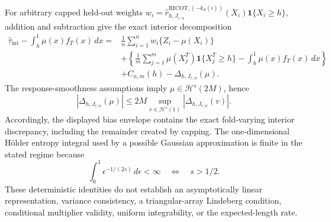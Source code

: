 For arbitrary capped held-out weights \(w_i=\widehat r^{\mathrm{RICOT},(-k_S(i))}_{h,J_{r,n}}(X_i)\mathbf 1\{X_i\ge h\}\), addition and subtraction give the exact interior decomposition
\[
\begin{aligned}
\widehat\tau_{\mathrm{int}}-\int_h^1\mu(x)f_T(x)\,dx
={}&\frac1n\sum_{i=1}^nw_i\{Z_i-\mu(X_i)\}\\
&+\left\{\frac1m\sum_{j=1}^m\mu(X_j^T)\mathbf 1\{X_j^T\ge h\}-\int_h^1\mu(x)f_T(x)\,dx\right\}\\
&+C_{n,m}(h)-\Delta_{h,J_{r,n}}(\mu).
\end{aligned}
\]
The response-smoothness assumptions imply \(\mu\in\mathcal H^s(2M)\), hence
\[
|\Delta_{h,J_{r,n}}(\mu)|\le2M\sup_{v\in\mathcal H^s(1)}|\Delta_{h,J_{r,n}}(v)|.
\]
Accordingly, the displayed bias envelope contains the exact fold-varying interior discrepancy, including the remainder created by capping. The one-dimensional Hölder entropy integral used by a possible Gaussian approximation is finite in the stated regime because
\[
\int_0^1\epsilon^{-1/(2s)}\,d\epsilon<\infty
\quad\Longleftrightarrow\quad s>1/2.
\]
These deterministic identities do not establish an asymptotically linear representation, variance consistency, a triangular-array Lindeberg condition, conditional multiplier validity, uniform integrability, or the expected-length rate.